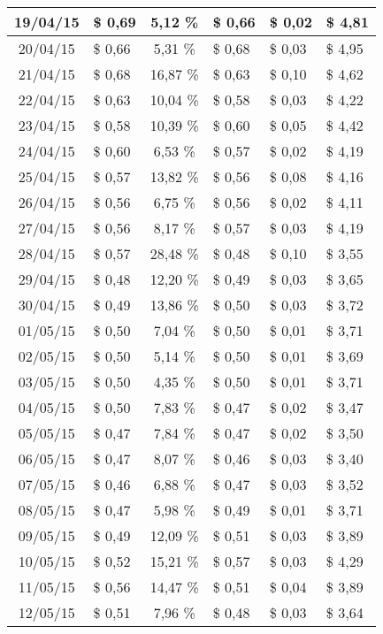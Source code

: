 \begin{center}
\begin{small}
\begin{longtable}{|c|l|c|l|l|l|}
19/04/15 & \$ 0,69 & 5,12 \% & \$ 0,66 & \$ 0,02 & \$ 4,81 \\ \hline
20/04/15 & \$ 0,66 & 5,31 \% & \$ 0,68 & \$ 0,03 & \$ 4,95 \\ \hline
21/04/15 & \$ 0,68 & 16,87 \% & \$ 0,63 & \$ 0,10 & \$ 4,62 \\ \hline
22/04/15 & \$ 0,63 & 10,04 \% & \$ 0,58 & \$ 0,03 & \$ 4,22 \\ \hline
23/04/15 & \$ 0,58 & 10,39 \% & \$ 0,60 & \$ 0,05 & \$ 4,42 \\ \hline
24/04/15 & \$ 0,60 & 6,53 \% & \$ 0,57 & \$ 0,02 & \$ 4,19 \\ \hline
25/04/15 & \$ 0,57 & 13,82 \% & \$ 0,56 & \$ 0,08 & \$ 4,16 \\ \hline
26/04/15 & \$ 0,56 & 6,75 \% & \$ 0,56 & \$ 0,02 & \$ 4,11 \\ \hline
27/04/15 & \$ 0,56 & 8,17 \% & \$ 0,57 & \$ 0,03 & \$ 4,19 \\ \hline
28/04/15 & \$ 0,57 & 28,48 \% & \$ 0,48 & \$ 0,10 & \$ 3,55 \\ \hline
29/04/15 & \$ 0,48 & 12,20 \% & \$ 0,49 & \$ 0,03 & \$ 3,65 \\ \hline
30/04/15 & \$ 0,49 & 13,86 \% & \$ 0,50 & \$ 0,03 & \$ 3,72 \\ \hline
01/05/15 & \$ 0,50 & 7,04 \% & \$ 0,50 & \$ 0,01 & \$ 3,71 \\ \hline
02/05/15 & \$ 0,50 & 5,14 \% & \$ 0,50 & \$ 0,01 & \$ 3,69 \\ \hline
03/05/15 & \$ 0,50 & 4,35 \% & \$ 0,50 & \$ 0,01 & \$ 3,71 \\ \hline
04/05/15 & \$ 0,50 & 7,83 \% & \$ 0,47 & \$ 0,02 & \$ 3,47 \\ \hline
05/05/15 & \$ 0,47 & 7,84 \% & \$ 0,47 & \$ 0,02 & \$ 3,50 \\ \hline
06/05/15 & \$ 0,47 & 8,07 \% & \$ 0,46 & \$ 0,03 & \$ 3,40 \\ \hline
07/05/15 & \$ 0,46 & 6,88 \% & \$ 0,47 & \$ 0,03 & \$ 3,52 \\ \hline
08/05/15 & \$ 0,47 & 5,98 \% & \$ 0,49 & \$ 0,01 & \$ 3,71 \\ \hline
09/05/15 & \$ 0,49 & 12,09 \% & \$ 0,51 & \$ 0,03 & \$ 3,89 \\ \hline
10/05/15 & \$ 0,52 & 15,21 \% & \$ 0,57 & \$ 0,03 & \$ 4,29 \\ \hline
11/05/15 & \$ 0,56 & 14,47 \% & \$ 0,51 & \$ 0,04 & \$ 3,89 \\ \hline
12/05/15 & \$ 0,51 & 7,96 \% & \$ 0,48 & \$ 0,03 & \$ 3,64 \\ \hline

\end{longtable}
\end{small}
\end{center}
